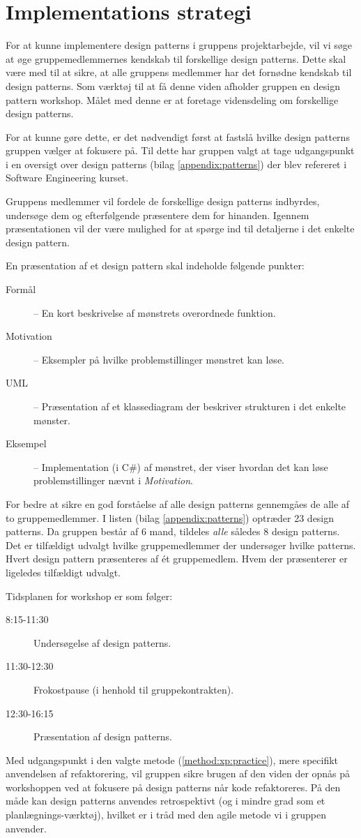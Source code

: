\section{Implementations strategi}
For at kunne implementere design patterns i gruppens projektarbejde, vil vi søge at øge gruppemedlemmernes kendskab til forskellige design patterns.
Dette skal være med til at sikre, at alle gruppens medlemmer har det fornødne kendskab til design patterns.
Som værktøj til at få denne viden afholder gruppen en design pattern workshop.
Målet med denne er at foretage vidensdeling om forskellige design patterns.

For at kunne gøre dette, er det nødvendigt først at fastslå hvilke design patterns gruppen vælger at fokusere på.
Til dette har gruppen valgt at tage udgangspunkt i en oversigt over design patterns (bilag \ref{appendix:patterns}) der blev refereret i Software Engineering kurset.

Gruppens medlemmer vil fordele de forskellige design patterns indbyrdes, undersøge dem og efterfølgende præsentere dem for hinanden.
Igennem præsentationen vil der være mulighed for at spørge ind til detaljerne i det enkelte design pattern.

En præsentation af et design pattern skal indeholde følgende punkter:
\begin{description}
\item[Formål] -- En kort beskrivelse af mønstrets overordnede funktion.
\item[Motivation] -- Eksempler på hvilke problemstillinger mønstret kan løse.
\item[UML] -- Præsentation af et klassediagram der beskriver strukturen i det enkelte mønster.
\item[Eksempel] -- Implementation (i C\#) af mønstret, der viser hvordan det kan løse problemstillinger nævnt i \emph{Motivation}.
\end{description}

For bedre at sikre en god forståelse af alle design patterns gennemgåes de alle af to gruppemedlemmer.
I listen (bilag \ref{appendix:patterns}) optræder 23 design patterns.
Da gruppen består af 6 mand, tildeles \textit{alle} således 8 design patterns.
Det er tilfældigt udvalgt hvilke gruppemedlemmer der undersøger hvilke patterns.
Hvert design pattern præsenteres af \'et gruppemedlem.
Hvem der præsenterer er ligeledes tilfældigt udvalgt.

Tidsplanen for workshop er som følger:
\begin{description}
\item [8:15-11:30] Undersøgelse af design patterns.
\item [11:30-12:30] Frokostpause (i henhold til gruppekontrakten).
\item [12:30-16:15] Præsentation af design patterns.
\end{description}

Med udgangspunkt i den valgte metode (\cref{method:xp:practice}), mere specifikt anvendelsen af refaktorering, vil gruppen sikre brugen af den viden der opnås på workshoppen ved at fokusere på design patterns når kode refaktoreres.
På den måde kan design patterns anvendes retrospektivt (og i mindre grad som et planlægnings-værktøj), hvilket er i tråd med den agile metode vi i gruppen anvender.